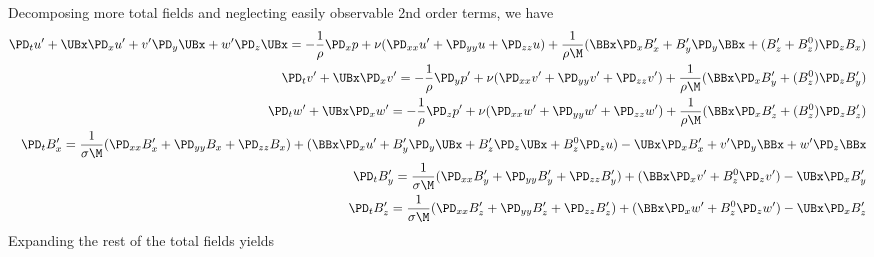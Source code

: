\documentclass[11pt]{article}
\begin{document}
Decomposing more total fields and neglecting easily observable 2nd order terms, we have
\begin{equation}\begin{aligned}
\PD_t u'+ \UBx\PD_x u' + v'\PD_y \UBx  + w'\PD_z \UBx = -\frac{1}{\rho}\PD_x p + \nu (\PD_{xx} u'+\PD_{yy} u +\PD_{zz} u ) + \frac{1}{\rho \M} (\BBx \PD_x B_x' + B_y' \PD_y \BBx + (B_z'+B_z^0) \PD_z B_x ) \\
\PD_t v'+ \UBx\PD_x v'                                = -\frac{1}{\rho}\PD_y p'+ \nu (\PD_{xx} v'+\PD_{yy} v'+\PD_{zz} v') + \frac{1}{\rho \M} (\BBx \PD_x B_y'                   + (     B_z^0) \PD_z B_y') \\
\PD_t w'+ \UBx\PD_x w'                                = -\frac{1}{\rho}\PD_z p'+ \nu (\PD_{xx} w'+\PD_{yy} w'+\PD_{zz} w') + \frac{1}{\rho \M} (\BBx \PD_x B_z'                   + (     B_z^0) \PD_z B_z') \\
\PD_t B_x' = \frac{1}{\sigma \M} (\PD_{xx} B_x' + \PD_{yy} B_x +\PD_{zz} B_x ) + (\BBx \PD_x u'+B_y'\PD_y \UBx +B_z'\PD_z \UBx +B_z^0 \PD_z u ) - \UBx\PD_x B_x'+v'\PD_y \BBx +w'\PD_z \BBx \\
\PD_t B_y' = \frac{1}{\sigma \M} (\PD_{xx} B_y' + \PD_{yy} B_y'+\PD_{zz} B_y') + (\BBx \PD_x v'                +                B_z^0 \PD_z v') - \UBx\PD_x B_y'                            \\
\PD_t B_z' = \frac{1}{\sigma \M} (\PD_{xx} B_z' + \PD_{yy} B_z'+\PD_{zz} B_z') + (\BBx \PD_x w'                +                B_z^0 \PD_z w') - \UBx\PD_x B_z'                            \\
\end{aligned} \end{equation}
Expanding the rest of the total fields yields
\end{document}
